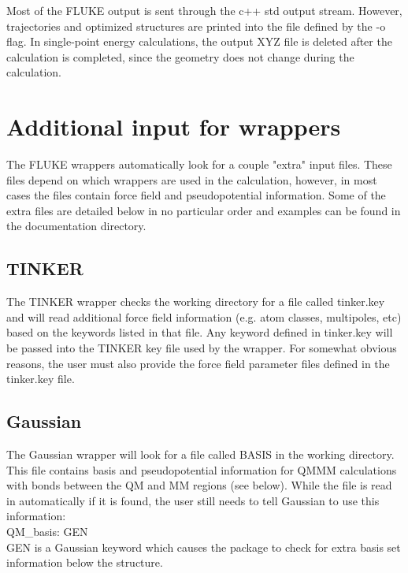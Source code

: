 \documentclass[12pt]{report}
\begin{document}
Most of the FLUKE output is sent through the c++ std output stream. However,
trajectories and optimized structures are printed into the file defined
by the -o flag. In single-point energy calculations, the output XYZ file
is deleted after the calculation is completed, since the geometry does not
change during the calculation.

\section{Additional input for wrappers}

The FLUKE wrappers automatically look for a couple "extra" input files. These
files depend on which wrappers are used in the calculation, however, in most
cases the files contain force field and pseudopotential information. Some of
the extra files are detailed below in no particular order and examples can be
found in the documentation directory.

\subsection{TINKER}

The TINKER wrapper checks the working directory for a file called tinker.key
and will read additional force field information (e.g. atom classes,
multipoles, etc) based on the keywords listed in that file. Any keyword
defined in tinker.key will be passed into the TINKER key file used by the
wrapper. For somewhat obvious reasons, the user must also provide the force
field parameter files defined in the tinker.key file.

\subsection{Gaussian}

The Gaussian wrapper will look for a file called BASIS in the working
directory. This file contains basis and pseudopotential information for
QMMM calculations with bonds between the QM and MM regions (see below).
While the file is read in automatically if it is found, the user still needs
to tell Gaussian to use this information: \\

QM\_basis: GEN \\

GEN is a Gaussian keyword which causes the package to check for extra basis
set information below the structure. \\
\end{document}
